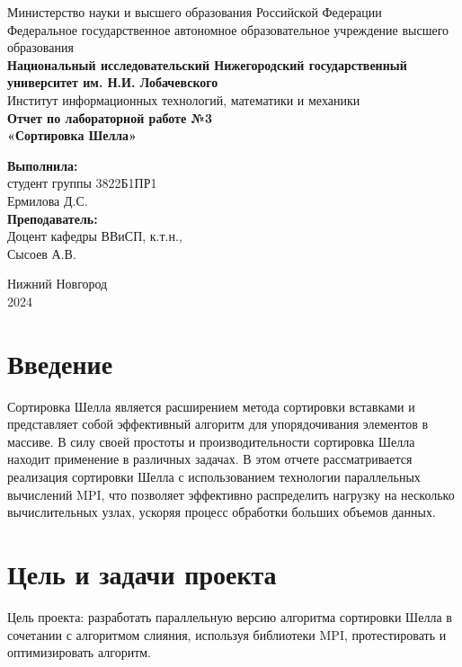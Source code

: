 \documentclass[a4paper,12pt]{article}
\renewcommand{\normalsize}{\fontsize{14}{16.8}\selectfont}
\begin{document}
\thispagestyle{empty} %
\begin{center}
    Министерство науки и высшего образования Российской Федерации\\[0.5cm]
    Федеральное государственное автономное образовательное учреждение высшего образования\\[0.1cm]
    \textbf{Национальный исследовательский Нижегородский государственный университет им. Н.И. Лобачевского}\\[0.1cm]
    Институт информационных технологий, математики и механики\\[2.5cm]

    \Huge
    \textbf{Отчет по лабораторной работе №3}\\[0.5cm]
    \LARGE
    \textbf{«Сортировка Шелла»}\\[2cm]

    \normalsize
    \begin{flushright}
        \textbf{Выполнила:}\\
        студент группы 3822Б1ПР1\\
        Ермилова Д.С.\\[1cm]

        \textbf{Преподаватель:}\\
        Доцент кафедры ВВиСП, к.т.н.,\\
        Сысоев А.В.\\
    \end{flushright}
    \vfill
    Нижний Новгород\\
    2024
\end{center}
\newpage %

\tableofcontents
\newpage

\section{Введение}
Сортировка Шелла является расширением метода сортировки вставками и представляет собой эффективный алгоритм для упорядочивания элементов в массиве. В силу своей простоты и производительности сортировка Шелла находит применение в различных задачах. В этом отчете рассматривается реализация сортировки Шелла с использованием технологии параллельных вычислений MPI, что позволяет эффективно распределить нагрузку на несколько вычислительных узлах, ускоряя процесс обработки больших объемов данных.

\section{Цель и задачи проекта}
Цель проекта: разработать параллельную версию алгоритма сортировки Шелла в сочетании с алгоритмом слияния, используя библиотеки MPI, протестировать и оптимизировать алгоритм.
\end{document}
